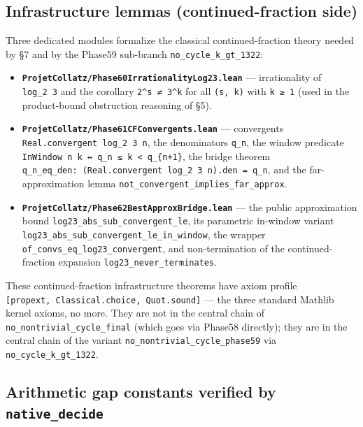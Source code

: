 \documentclass[
  11pt]{amsart}
\providecommand{\tightlist}{%
  \setlength{\itemsep}{0pt}\setlength{\parskip}{0pt}}
\theoremstyle{plain}
\theoremstyle{definition}
\theoremstyle{remark}
\begin{document}
\subsection{Infrastructure lemmas (continued-fraction
side)}\label{infrastructure-lemmas-continued-fraction-side}

Three dedicated modules formalize the classical continued-fraction
theory needed by §7 and by the Phase59 sub-branch
\texttt{no\_cycle\_k\_gt\_1322}:

\begin{itemize}
\tightlist
\item
  \textbf{\texttt{ProjetCollatz/Phase60IrrationalityLog23.lean}} ---
  irrationality of \texttt{log\_2\ 3} and the corollary
  \texttt{2\^{}s\ ≠\ 3\^{}k} for all \texttt{(s,\ k)} with
  \texttt{k\ ≥\ 1} (used in the product-bound obstruction reasoning of
  §5).
\item
  \textbf{\texttt{ProjetCollatz/Phase61CFConvergents.lean}} ---
  convergents \texttt{Real.convergent\ log\_2\ 3\ n}, the denominators
  \texttt{q\_n}, the window predicate
  \texttt{InWindow\ n\ k\ ↔\ q\_n\ ≤\ k\ \textless{}\ q\_\{n+1\}}, the
  bridge theorem
  \texttt{q\_n\_eq\_den:\ (Real.convergent\ log\_2\ 3\ n).den\ =\ q\_n},
  and the far-approximation lemma
  \texttt{not\_convergent\_implies\_far\_approx}.
\item
  \textbf{\texttt{ProjetCollatz/Phase62BestApproxBridge.lean}} --- the
  public approximation bound \texttt{log23\_abs\_sub\_convergent\_le},
  its parametric in-window variant
  \texttt{log23\_abs\_sub\_convergent\_le\_in\_window}, the wrapper
  \texttt{of\_convs\_eq\_log23\_convergent}, and non-termination of the
  continued-fraction expansion \texttt{log23\_never\_terminates}.
\end{itemize}

These continued-fraction infrastructure theorems have axiom profile
\texttt{{[}propext,\ Classical.choice,\ Quot.sound{]}} --- the three
standard Mathlib kernel axioms, no more. They are not in the central
chain of \texttt{no\_nontrivial\_cycle\_final} (which goes via Phase58
directly); they are in the central chain of the variant
\texttt{no\_nontrivial\_cycle\_phase59} via
\texttt{no\_cycle\_k\_gt\_1322}.

\subsection{\texorpdfstring{Arithmetic gap constants verified by
\texttt{native\_decide}}{Arithmetic gap constants verified by native\_decide}}\label{arithmetic-gap-constants-verified-by-native_decide}
\end{document}
